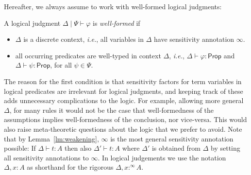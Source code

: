 \documentclass[a4paper,UKenglish,cleveref, autoref, thm-restate]{lipics-v2021}
\newcommand{\ie}{\textit{i.e.}}
\newcommand{\scaling}{}
\newcommand{\ts}{\vdash}
\newcommand{\hastype}[3]{#1\ts #2 : #3}
\newcommand{\Prop}{\mathsf{Prop}}
\newcommand{\logicJ}[3][\Delta]{#1 \mid #2 \vdash #3}
\begin{document}
Hereafter, we always assume to work with well-formed logical judgments:
\begin{definition}
A logical judgment $\logicJ{\Psi}{\varphi}$ is \emph{well-formed} if
\begin{itemize}
    \item $\Delta$ is a discrete context, \ie, all variables in $\Delta$ have sensitivity annotation $\infty$. %
    \item all occurring predicates are well-typed in context $\Delta$, \ie, 
    $\hastype{\Delta}{\varphi}{\Prop}$ and $\hastype{\Delta}{\psi}{\Prop}$, for all $\psi\in\Psi$.
\end{itemize}
\end{definition}
The reason for the first condition is that sensitivity factors for term variables in logical predicates are irrelevant for logical judgments, and 
keeping track of these adds unnecessary complications to the logic. For example, allowing more general $\Delta$, for many
rules it would not be the case that well-formedness of the assumptions implies well-formedness of the conclusion, nor vice-versa. 
This would also raise meta-theoretic questions about the logic that we prefer to avoid. 
Note that by Lemma~\ref{lm:weakening},
$\infty$ is the most general 
sensitivity annotation possible: If $\hastype\Delta{t}A$ then also $\hastype{\Delta'}{t}A$ where $\Delta'$ is obtained from $\Delta$ by setting all
sensitivity annotations to $\infty$. 
In logical judgements we use the notation $\Delta, x:A$ as shorthand for the rigorous 
$\Delta, x:^\infty A$. %
\end{document}
